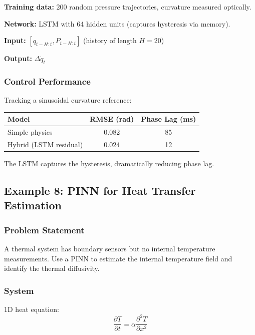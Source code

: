 \textbf{Training data:} 200 random pressure trajectories, curvature measured optically.

\textbf{Network:} LSTM with 64 hidden units (captures hysteresis via memory).

\textbf{Input:} $[q_{t-H:t}, P_{t-H:t}]$ (history of length $H = 20$)

\textbf{Output:} $\Delta \dot{q}_t$

\subsubsection{Control Performance}

Tracking a sinusoidal curvature reference:

\begin{center}
\begin{tabular}{lcc}
\toprule
\textbf{Model} & \textbf{RMSE (rad)} & \textbf{Phase Lag (ms)} \\
\midrule
Simple physics & 0.082 & 85 \\
Hybrid (LSTM residual) & 0.024 & 12 \\
\bottomrule
\end{tabular}
\end{center}

The LSTM captures the hysteresis, dramatically reducing phase lag.

\subsection{Example 8: PINN for Heat Transfer Estimation}
\label{ex:pinn_thermal}

\subsubsection{Problem Statement}

A thermal system has boundary sensors but no internal temperature measurements. Use a PINN to estimate the internal temperature field and identify the thermal diffusivity.

\subsubsection{System}

1D heat equation:
\begin{equation}
\frac{\partial T}{\partial t} = \alpha \frac{\partial^2 T}{\partial x^2}
\end{equation}

